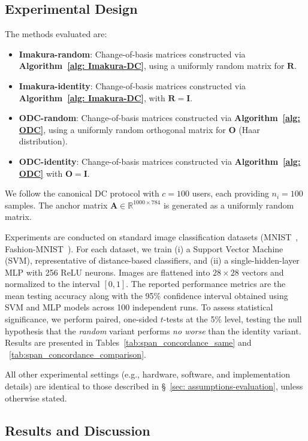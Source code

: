 \documentclass[final,3p,times]{elsarticle}
\theoremstyle{plain}
\newcommand{\matr}[1]{\bm{#1}}        %
\begin{document}
\subsection{Experimental Design}
The methods evaluated are:

\begin{itemize}
    \item \textbf{Imakura-random}: Change-of-basis matrices constructed via \textbf{Algorithm~\ref{alg: Imakura-DC}}, using a uniformly random matrix for \(\matr{R}\).
    \item \textbf{Imakura-identity}: Change-of-basis matrices constructed via \textbf{Algorithm~\ref{alg: Imakura-DC}}, with \(\matr{R} = \matr{I}\).
    \item \textbf{ODC-random}: Change-of-basis matrices constructed via \textbf{Algorithm~\ref{alg: ODC}}, using a uniformly random orthogonal matrix for \(\matr{O}\) (Haar distribution).
    \item \textbf{ODC-identity}: Change-of-basis matrices constructed via \textbf{Algorithm~\ref{alg: ODC}} with \(\matr{O} = \matr{I}\).
\end{itemize}

We follow the canonical DC protocol with \(c=100\) users, each providing \(n_i=100\) samples. The anchor matrix \(\matr{A} \in \mathbb{R}^{1000\times 784}\) is generated as a uniformly random matrix. 

Experiments are conducted on standard image classification datasets (MNIST~\cite{MNIST}, Fashion-MNIST~\cite{fashionmnist}). For each dataset, we train (i) a Support Vector Machine (SVM), representative of distance-based classifiers, and (ii) a single-hidden-layer MLP with 256 ReLU neurons. Images are flattened into $28\times28$ vectors and normalized to the interval $[0,1]$. The reported performance metrics are the mean testing accuracy along with the 95\% confidence interval obtained using SVM and MLP models across 100 independent runs. To assess statistical significance, we perform paired, one-sided \(t\)-tests at the 5\% level, testing the null hypothesis that the \emph{random} variant performs \emph{no worse} than the identity variant. Results are presented in Tables~\ref{tab:span_concordance_same} and ~\ref{tab:span_concordance_comparison}.

All other experimental settings (e.g., hardware, software, and implementation details) are identical to those described in \S~\ref{sec: assumptions-evaluation}, unless otherwise stated.


\subsection{Results and Discussion}
\end{document}
